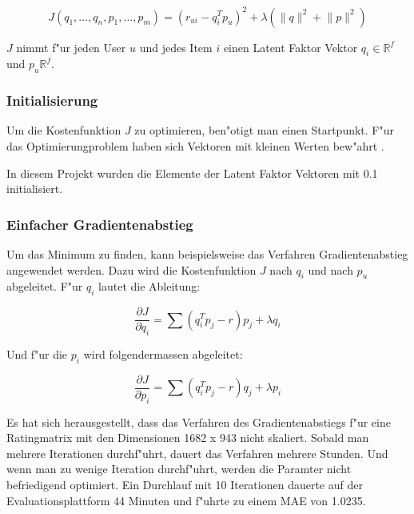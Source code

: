 \documentclass[a4paper, 12pt]{article}
\begin{document}
\begin{equation}
  \label{eq:costfunction}
  J(q_1, \dots , q_n, p_1, \dots, p_m) =  (r_{ui} - q_i^T p_u)^2 + \lambda (\lVert q \rVert^2 + \lVert p \lVert ^2)
\end{equation}

$J$ nimmt f"ur jeden User $u$ und jedes Item $i$ einen Latent Faktor Vektor $q_i \in \mathbb{R}^f$ und $p_u \mathbb{R}^f$.

\subsubsection{Initialisierung}
\label{sec:init}

Um die Kostenfunktion $J$ zu optimieren, ben"otigt man einen Startpunkt. F"ur das Optimierungproblem \label{eq:objective} haben sich Vektoren mit kleinen Werten bew"ahrt \cite{Takacs08}. 

In diesem Projekt wurden die Elemente der Latent Faktor Vektoren mit 0.1 initialisiert.

\subsubsection{Einfacher Gradientenabstieg}
\label{sec:gradientdescent}
 
Um das Minimum zu finden, kann beispielsweise das Verfahren Gradientenabstieg angewendet werden. Dazu wird die Kostenfunktion $J$ nach $q_i$ und nach $p_u$ abgeleitet. F"ur $q_i$ lautet die Ableitung:

\begin{equation}
  \label{eq:decx}
  \frac{ \partial J }{ \partial q_i } = \sum (q_i^T p_j - r) p_j + \lambda q_i
\end{equation}

Und f"ur die $p_i$ wird folgendermassen abgeleitet:

\begin{equation}
  \label{eq:dectheta}
  \frac{ \partial J }{ \partial p_i } = \sum (q_i^T p_j - r) q_j + \lambda p_i
\end{equation}

Es hat sich herausgestellt, dass das Verfahren des Gradientenabstiegs f"ur eine Ratingmatrix mit den Dimensionen 1682 x 943 nicht skaliert. Sobald man mehrere Iterationen durchf"uhrt, dauert das Verfahren mehrere Stunden. Und wenn man zu wenige Iteration durchf"uhrt, werden die Paramter nicht befriedigend optimiert. Ein Durchlauf mit 10 Iterationen dauerte auf der Evaluationsplattform 44 Minuten und f"uhrte zu einem MAE von 1.0235.
\end{document}
